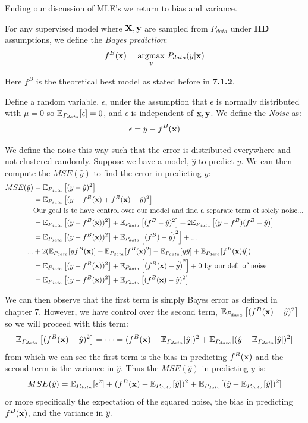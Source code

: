 Ending our discussion of MLE's we return to bias and variance. 
\begin{definition}
    For any supervised model where $\MX, \vy$ are sampled from $P_{data}$ under \textbf{IID} assumptions, we define the \textit{Bayes prediction}: 
    $$f^B(\vx) = \underset{y}{\argmax}\ P_{data}(y|\vx)$$
\end{definition}
Here $f^B$ is the theoretical best model as stated before in \textbf{7.1.2}. 
\begin{definition}
    Define a random variable, $\epsilon$, under the assumption that $\epsilon$ is normally distributed with $\mu=0$ so $\Ev_{P_{data}}[\epsilon] = 0$, and $\epsilon$ is independent of $\vx,\vy$. We define the \textit{Noise} as:
    $$\epsilon = y - f^B(\vx)$$
\end{definition}
We define the noise this way such that the error is distributed everywhere and not clustered randomly. Suppose we have a model, $\hat{y}$ to predict $y$. We can then compute the $MSE(\hat{y})$ to find the error in predicting $y$:
\begin{align*}
    MSE(\hat{y}) &= \Ev_{P_{data}}\left[(y - \hat{y})^2\right] \\
    & = \Ev_{P_{data}}\left[(y - f^B(\vx) + f^B(\vx) - \hat{y})^2 \right] \\
    & \text{Our goal is to have control over our model and find a separate term of solely noise...} \\
    & = \Ev_{P_{data}}\left[(y - f^B(\vx))^2\right] + \Ev_{P_{data}}\left[(f^B - \hat{y})^2 \right]+ 2\Ev_{P_{data}}\left[(y-f^B)(f^B-\hat{y}) \right] \\ 
    & =\Ev_{P_{data}}\left[(y - f^B(\vx))^2\right] + \Ev_{P_{data}}\left[(f^B) - \hat{y)}^2 \right]+...\\
    ...&+2(\Ev_{P_{data}}[yf^B(\vx)]- \Ev_{P_{data}}[f^B(\vx)^2]-\Ev_{P_{data}}[y\hat{y}]+\Ev_{P_{data}}[f^B(\vx)\hat{y}])\\
    & = \Ev_{P_{data}}\left[(y - f^B(\vx))^2\right] + \Ev_{P_{data}}\left[(f^B(\vx) - \hat{y)}^2 \right] + 0\text{    by our def. of noise} \\
    & = \Ev_{P_{data}}\left[(y - f^B(\vx))^2\right] + \Ev_{P_{data}}\left[(f^B(\vx) - \hat{y})^2 \right]
\end{align*}

We can then observe that the first term is simply Bayes error as defined in chapter 7. However, we have control over the second term, $\Ev_{P_{data}}\left[(f^B(\vx) - \hat{y})^2 \right]$ so we will proceed with this term: 
$$\Ev_{P_{data}}\left[(f^B(\vx) - \hat{y})^2 \right]  = \dots = (f^B(\vx)- \Ev_{P_{data}}[\hat{y}])^2 + \Ev_{P_{data}}[(\hat{y}-\Ev_{P_{data}}[\hat{y}])^2]$$
from which we can see the first term is the bias in predicting $f^B(\vx)$ and the second term is the variance in $\hat{y}$. Thus the $MSE(\hat{y})$ in predicting $y$ is: 
$$MSE(\hat{y}) = \Ev_{P_{data}}[\epsilon^2] + (f^B(\vx)- \Ev_{P_{data}}[\hat{y}])^2 +  \Ev_{P_{data}}[(\hat{y}-\Ev_{P_{data}}[\hat{y}])^2] $$
or more specifically the expectation of the squared noise, the bias in predicting $f^B(\vx)$, and the variance in $\hat{y}$.
